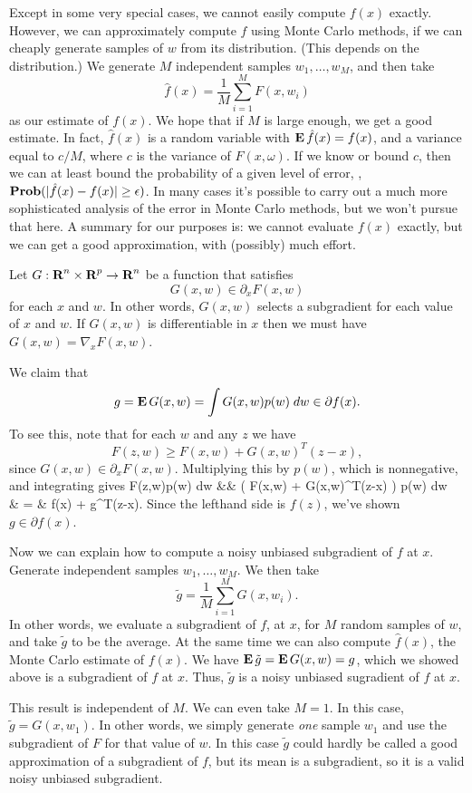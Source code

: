 \documentclass[12pt]{article}
\begin{document}
Except in some very special cases, we cannot easily compute $f(x)$
exactly.  However, we can approximately compute $f$ using Monte Carlo
methods, if we can cheaply generate samples of $w$
from its distribution.  (This depends on the distribution.)
We generate $M$ independent samples $w_1, \ldots, w_M$, and then take
\[
\hat f(x) = \frac{1}{M} \sum_{i=1}^M F(x,w_i)
\]
as our estimate of $f(x)$.  We hope that if $M$ is
large enough, we get a good estimate.
In fact, $\hat f(x)$ is a
random variable with $\mathop{\bf E{}} \hat f(x) = f(x)$, and a
variance equal to $c/M$, where $c$ is the variance of $F(x,\omega)$.
If we know or bound $c$, then we can at least bound the probability
of a given level of error, \ie,
$\mathop{\bf Prob} (|\hat f(x) - f(x)| \geq \epsilon)$.
In many cases it's possible to carry out a much more sophisticated
analysis of the error in Monte Carlo methods, but we won't pursue that
here.
A summary for our purposes is:
we cannot evaluate $f(x)$ exactly, but we can get
a good approximation, with (possibly) much effort.


Let $G: {\mbox{\bf R}}^n \times
{\mbox{\bf R}}^p \rightarrow {\mbox{\bf R}}^n$ be a function that satisfies
\[
G(x,w) \in \partial_x F(x,w)
\]
for each $x$ and $w$.
In other words, $G(x,w)$ selects a subgradient for each
value of $x$ and $w$.  If $G(x,w)$ is differentiable in $x$
then we must have $G(x,w)=\nabla _xF(x,w)$.

We claim that
\[
g=\mathop{\bf E{}} G(x,w) = \int G(x,w) p(w) \; dw \in \partial f(x).
\]
To see this, note that for each $w$ and any $z$ we have
\[
F(z,w) \geq F(x,w) + G(x,w)^T(z-x),
\]
since $G(x,w) \in \partial_x F(x,w)$.
Multiplying this by $p(w)$, which is nonnegative, and integrating
gives
\BEAS
\int F(z,w)p(w)\; dw &\geq&
\int \left( F(x,w) + G(x,w)^T(z-x) \right) p(w) \; dw\\
& = &
f(x) + g^T(z-x).
\EEAS
Since the lefthand side is $f(z)$, we've shown $g \in \partial f(x)$.

Now we can explain how to compute a noisy unbiased
subgradient of $f$ at $x$.
Generate independent samples $w_1, \ldots, w_M$.
We then take
\[
\tilde g = \frac{1}{M} \sum_{i=1}^M G(x,w_i).
\]
In other words, we evaluate a subgradient of $f$, at $x$, for
$M$ random samples of $w$, and take $\tilde g$ to be the average.
At the same time we can also compute $\hat f(x)$, the Monte
Carlo estimate of $f(x)$.
We have $\mathop{\bf E{}} \tilde g = \mathop{\bf E{}} G(x,w) =g$, which we showed
above is a subgradient of $f$ at $x$.  Thus, $\tilde g$ is a noisy
unbiased sugradient of $f$ at $x$.

This result is independent of $M$.  We can even take $M=1$. In
this case, $\tilde g = G(x,w_1)$.  In other words, we simply
generate \emph{one} sample $w_1$ and use the subgradient of
$F$ for that value of $w$. In this case $\tilde g$ could hardly
be called a good approximation of a subgradient of $f$, but its
mean is a subgradient, so it is a valid noisy unbiased subgradient.
\end{document}
